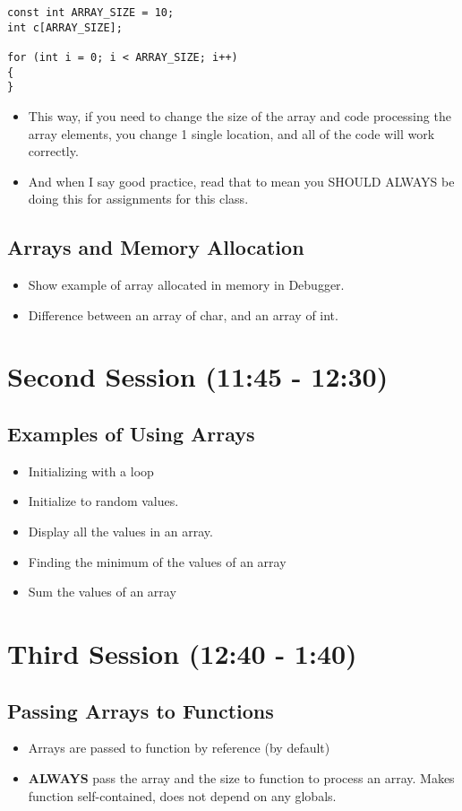 \documentclass[11pt]{article}
\begin{document}
\begin{verbatim}
const int ARRAY_SIZE = 10;
int c[ARRAY_SIZE];

for (int i = 0; i < ARRAY_SIZE; i++)
{
}
\end{verbatim}

\begin{itemize}
\item This way, if you need to change the size of the array and code
processing the array elements, you change 1 single location, and all
of the code will work correctly.
\item And when I say good practice, read that to mean you SHOULD ALWAYS
be doing this for assignments for this class.
\end{itemize}
\subsection{Arrays and Memory Allocation}
\label{sec-1-2}
\begin{itemize}
\item Show example of array allocated in memory in Debugger.
\item Difference between an array of char, and an array of int.
\end{itemize}
\section{Second Session (11:45 - 12:30)}
\label{sec-2}
\subsection{Examples of Using Arrays}
\label{sec-2-1}
\begin{itemize}
\item Initializing with a loop
\item Initialize to random values.
\item Display all the values in an array.
\item Finding the minimum of the values of an array
\item Sum the values of an array
\end{itemize}
\section{Third Session (12:40 - 1:40)}
\label{sec-3}
\subsection{Passing Arrays to Functions}
\label{sec-3-1}
\begin{itemize}
\item Arrays are passed to function by reference (by default)
\item \textbf{ALWAYS} pass the array and the size to function to process an
array.  Makes function self-contained, does not depend on any
globals.
\end{itemize}
\end{document}
